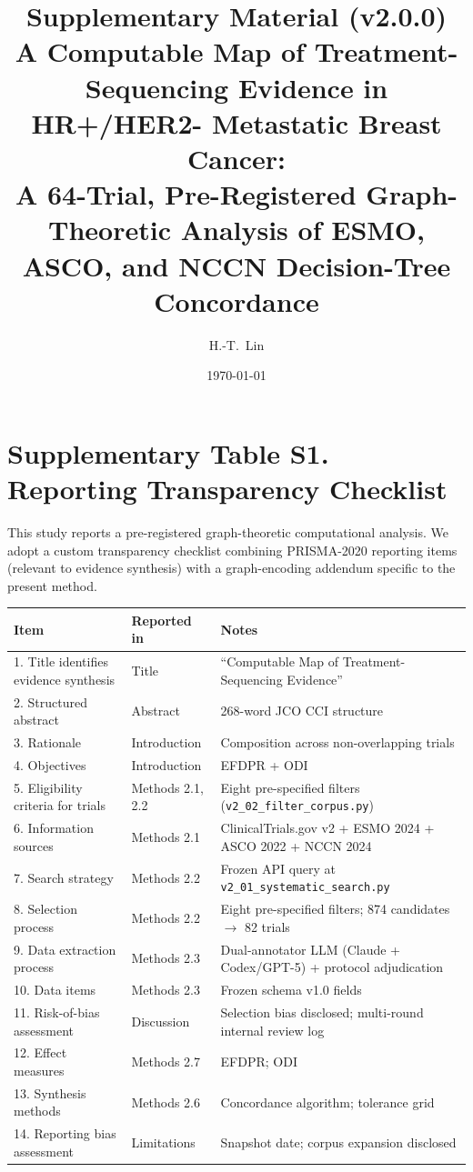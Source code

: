 \documentclass[11pt,a4paper]{article}
\title{\textbf{Supplementary Material (v2.0.0)} \\
A Computable Map of Treatment-Sequencing Evidence in HR+/HER2- Metastatic Breast Cancer:\\
A 64-Trial, Pre-Registered Graph-Theoretic Analysis of ESMO, ASCO, and NCCN Decision-Tree Concordance}
\author{H.-T.\ Lin}
\date{\today}
\begin{document}
\maketitle

\section*{Supplementary Table S1. Reporting Transparency Checklist}
\noindent
This study reports a pre-registered graph-theoretic computational analysis. We adopt a custom transparency checklist combining PRISMA-2020 reporting items (relevant to evidence synthesis) with a graph-encoding addendum specific to the present method.

\begin{longtable}{p{5.6cm}p{3.0cm}p{6.0cm}}
\toprule
\textbf{Item} & \textbf{Reported in} & \textbf{Notes} \\
\midrule
\endhead
1. Title identifies evidence synthesis & Title & ``Computable Map of Treatment-Sequencing Evidence'' \\
2. Structured abstract & Abstract & 268-word JCO CCI structure \\
3. Rationale & Introduction & Composition across non-overlapping trials \\
4. Objectives & Introduction & EFDPR + ODI \\
5. Eligibility criteria for trials & Methods 2.1, 2.2 & Eight pre-specified filters (\texttt{v2\_02\_filter\_corpus.py}) \\
6. Information sources & Methods 2.1 & ClinicalTrials.gov v2 + ESMO 2024 + ASCO 2022 + NCCN 2024 \\
7. Search strategy & Methods 2.2 & Frozen API query at \texttt{v2\_01\_systematic\_search.py} \\
8. Selection process & Methods 2.2 & Eight pre-specified filters; 874 candidates $\to$ 82 trials \\
9. Data extraction process & Methods 2.3 & Dual-annotator LLM (Claude + Codex/GPT-5) + protocol adjudication \\
10. Data items & Methods 2.3 & Frozen schema v1.0 fields \\
11. Risk-of-bias assessment & Discussion & Selection bias disclosed; multi-round internal review log \\
12. Effect measures & Methods 2.7 & EFDPR; ODI \\
13. Synthesis methods & Methods 2.6 & Concordance algorithm; tolerance grid \\
14. Reporting bias assessment & Limitations & Snapshot date; corpus expansion disclosed \\

\end{longtable}
\end{document}
